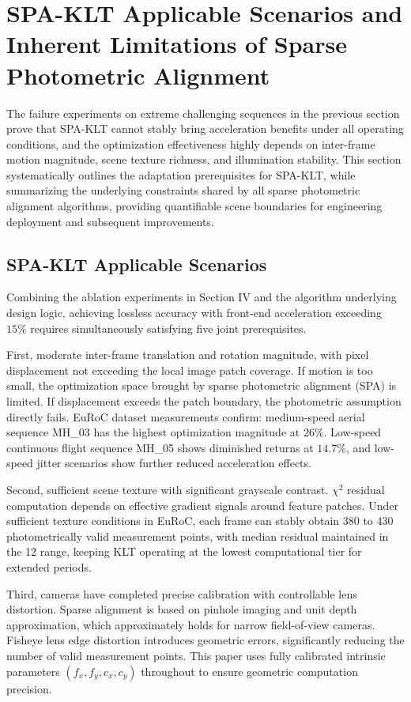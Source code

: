 \documentclass[journal,twoside,web]{ieeecolor}
\begin{document}
\section{SPA-KLT Applicable Scenarios and Inherent Limitations of Sparse Photometric Alignment}
\label{sec:limitations}

The failure experiments on extreme challenging sequences in the previous section prove that SPA-KLT cannot stably bring acceleration benefits under all operating conditions, and the optimization effectiveness highly depends on inter-frame motion magnitude, scene texture richness, and illumination stability. This section systematically outlines the adaptation prerequisites for SPA-KLT, while summarizing the underlying constraints shared by all sparse photometric alignment algorithms, providing quantifiable scene boundaries for engineering deployment and subsequent improvements.

\subsection{SPA-KLT Applicable Scenarios}

Combining the ablation experiments in Section IV and the algorithm underlying design logic, achieving lossless accuracy with front-end acceleration exceeding $15\%$ requires simultaneously satisfying five joint prerequisites.

First, moderate inter-frame translation and rotation magnitude, with pixel displacement not exceeding the local image patch coverage. If motion is too small, the optimization space brought by sparse photometric alignment (SPA) is limited. If displacement exceeds the patch boundary, the photometric assumption directly fails. EuRoC dataset measurements confirm: medium-speed aerial sequence MH\_03 has the highest optimization magnitude at $26\%$. Low-speed continuous flight sequence MH\_05 shows diminished returns at $14.7\%$, and low-speed jitter scenarios show further reduced acceleration effects.

Second, sufficient scene texture with significant grayscale contrast. $\chi^{2}$ residual computation depends on effective gradient signals around feature patches. Under sufficient texture conditions in EuRoC, each frame can stably obtain 380 to 430 photometrically valid measurement points, with median residual maintained in the 12 range, keeping KLT operating at the lowest computational tier for extended periods.

Third, cameras have completed precise calibration with controllable lens distortion. Sparse alignment is based on pinhole imaging and unit depth approximation, which approximately holds for narrow field-of-view cameras. Fisheye lens edge distortion introduces geometric errors, significantly reducing the number of valid measurement points. This paper uses fully calibrated intrinsic parameters $(f_{x}, f_{y}, c_{x}, c_{y})$ throughout to ensure geometric computation precision.
\end{document}

